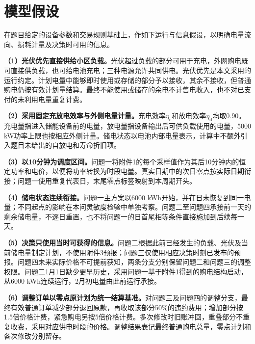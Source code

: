 \section{模型假设}
在题目给定的设备参数和交易规则基础上，作如下运行与信息假设，以明确电量流向、损耗计量及决策时可用的信息。

\textbf{（1）光伏优先直接供给小区负载。}光伏超过负载的部分可用于充电，外网购电既可直接供负载，也可给电池充电；三种电源允许共同供电。光伏优先是本文采用的运行约定。计划电量中能够即时使用或存储的部分予以接收，其余不接收，但普通购电仍按有效计划量结算。最终不能使用或储存的余电不计售电收入，也不对已支付的未利用电量重复计费。

\textbf{（2）采用固定充放电效率与外侧电量计量。}充电效率$\eta_{\mathrm c}$和放电效率$\eta_{\mathrm d}$均取0.90。充电量指进入储能设备前的电量，放电量指设备输出后可供负载使用的电量，5000 kW功率上限也按相应外侧计量。储电状态以电池内部电量表示，计算中不额外引入题目未给出的自放电和寿命折旧项。

\textbf{（3）以10分钟为调度区间。}问题一将附件1的每个采样值作为其后10分钟内的恒定功率和电价，以便将功率转换为时段电量。真实日期中的次日零点按实际日期衔接；问题一使用重复代表日，末尾零点标签映射到本周期开头。

\textbf{（4）储电状态连续衔接。}问题一主方案以6000 kWh开始，并在日末恢复到同一电量；不同起点的影响在本问灵敏度检验中单独考察。问题二至问题四承接前一天的剩余储电量，不逐日重置，也不将问题一的日首尾相等条件直接施加到后续每一天。

\textbf{（5）决策只使用当时可获得的信息。}问题二根据此前已经发生的负载、光伏及当前储电量制定计划，不使用附件3预报；问题三仅使用相应决策时刻已发布的预报。问题四未来实际价格不可提前获知，两条分支分别保留问题二和问题三的调整权限。问题二1月1日缺少更早历史，采用问题一基于附件1得到的购电结构启动，从6000 kWh连续运行，2月初电量由此前运行承接。

\textbf{（6）调整订单以零点原计划为统一结算基准。}对问题三及问题四的调整分支，最终有效普通订单减少部分退回原款，再收取该部分50\%的违约费用；增加部分按1.5倍价格计费，紧急购电另按5倍价格计费。多次修改时旧账冲回，重叠部分不重复收费，采用对应供电时段的价格。调整结果表记最终普通购电总量，零点计划和各次修改分别留存。
